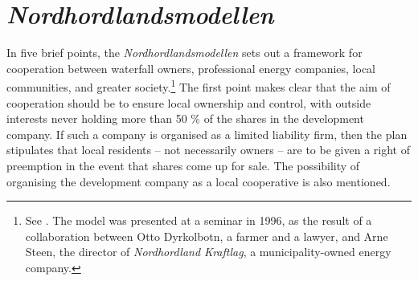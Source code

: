 
\section{{\it Nordhordlandsmodellen}}

In five brief points, the {\it Nordhordlandsmodellen} sets out a framework for cooperation between waterfall owners, professional energy companies, local communities, and greater society.\footnote{See \cite{dyrkolbotn96}. The model was presented at a seminar in 1996, as the result of a collaboration between Otto Dyrkolbotn, a farmer and a lawyer, and Arne Steen, the director of {\it Nordhordland Kraftlag}, a municipality-owned energy company.} %
The first point makes clear that the aim of cooperation should be to ensure local ownership and control, with outside interests never holding more than 50 \% of the shares in the development company. If such a company is organised as a limited liability firm, then the plan stipulates that local residents -- not necessarily owners -- are to be given a right of preemption in the event that shares come up for sale. The possibility of organising the development company as a local cooperative is also mentioned.

